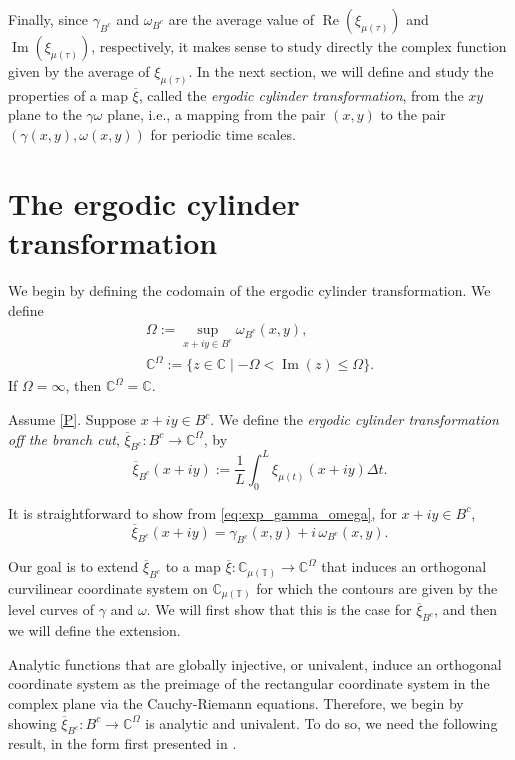 \documentclass[reqno]{amsart}
\DeclareMathOperator{\myRe}{Re}
\DeclareMathOperator{\myIm}{Im}
\begin{document}
Finally, since $\gamma_{B^c}$ and $\omega_{B^c}$ are the average value of
$\myRe(\xi_{\mu(\tau)})$ and $\myIm(\xi_{\mu(\tau)})$, respectively, it makes sense to
study directly the complex function given by the average of $\xi_{\mu(\tau)}$.
In the next section, we will define and study the properties of a map $\overline{\xi}$,
called the \emph{ergodic cylinder transformation}, from the $xy$ plane to the
$\gamma \omega$ plane, i.e., a mapping from the pair $(x,y)$ to the pair
$(\gamma(x,y),\omega(x,y))$ for periodic time scales.

\section{The ergodic cylinder transformation}

We begin by defining the codomain of the ergodic cylinder transformation. We define
 \begin{gather*}
 \Omega := \sup_{x+iy \in B^c} \omega_{B^c}(x,y),\\
 \mathbb{C}^{\Omega} := \{z \in \mathbb{C} \mid -\Omega< \myIm(z) \leq \Omega\}.
 \end{gather*}
If $\Omega=\infty$, then $\mathbb{C}^{\Omega} = \mathbb{C}$.

\begin{definition}
\label{def:xibarBc} \rm
Assume \eqref{P}. Suppose $x+iy\in B^c$. We define the \emph{ergodic cylinder
 transformation off the branch cut}, $\overline{\xi}_{B^c}: B^c \to \mathbb{C}^{\Omega}$, by
$$
 \overline{\xi}_{B^c}(x+iy):=\frac{1}{L}\int_{0}^{L} \xi_{\mu(t)}(x+iy) \Delta t.
$$
\end{definition}

It is straightforward to show from \eqref{eq:exp_gamma_omega}, for $x+iy \in B^c$,
\begin{equation} \label{eq:gamOm}
 \overline{\xi}_{B^c}(x+iy) = \gamma_{B^c}(x,y) + i\,\omega_{B^c}(x,y).
\end{equation}

Our goal is to extend $\overline{\xi}_{B^c}$ to a map $\overline{\xi}:\mathbb{C}_{\mu(\mathbb{T})} \to \mathbb{C}^{\Omega}$
that induces an orthogonal curvilinear coordinate system on $\mathbb{C}_{\mu(\mathbb{T})}$ for which
the contours are given by the level curves of $\gamma$ and $\omega$. We will first show
that this is the case for $\overline{\xi}_{B^c}$, and then we will define the extension.

Analytic functions that are globally injective, or univalent, induce an orthogonal
coordinate system as the preimage of the rectangular coordinate system in the complex
plane via the Cauchy-Riemann equations. Therefore, we begin by showing
$\overline{\xi}_{B^c}:B^c \to \mathbb{C}^{\Omega}$ is analytic and univalent. To do so, we need the
following result, in the form first presented in \cite[Theorem~8]{AvAk}.
\end{document}
